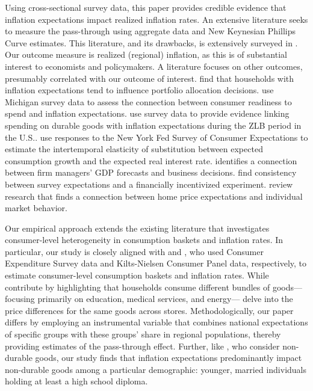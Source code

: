 \documentclass[12pt]{article}
\begin{document}
Using cross-sectional survey data, this paper provides credible evidence that inflation expectations impact realized inflation rates.  An extensive literature seeks to measure the pass-through using aggregate data and New Keynesian Phillips Curve estimates.  This literature, and its drawbacks, is extensively surveyed in \cite{Stocketal:JEL2014}.  Our outcome measure is realized (regional) inflation, as this is of substantial interest to economists and policymakers.  A literature focuses on other outcomes, presumably correlated with our outcome of interest.  \cite{Dacunto:groceryJPE} find that households with inflation expectations tend to influence portfolio allocation decisions. \cite{BachmannBergSims:AEJ2015} use Michigan survey data to assess the connection between consumer readiness to spend and inflation expectations. \cite{BurkeOzdagli:2022WP} use survey data to provide evidence linking spending on durable goods with inflation expectations during the ZLB period in the U.S.. \cite{CrumpEusepi:2021} use responses to the New York Fed Survey of Consumer Expectations to estimate the intertemporal elasticity of substitution between expected consumption growth and the expected real interest rate. \cite{TanakaBloom:JME2020} identifies a connection between firm managers' GDP forecasts and business decisions.  \cite{Armantieretal:IER2015} find consistency between survey expectations and a financially incentivized experiment. \cite{KuchlerPiazzesiStroebel:2022} review research that finds a connection between home price expectations and individual market behavior.  

Our empirical approach extends the existing literature that investigates consumer-level heterogeneity in consumption baskets and inflation rates. In particular, our study is closely aligned with \cite{HobijnLagakos:2005}  and \cite{KaplanWohl:JME2017}, who used Consumer Expenditure Survey data and Kilts-Nielsen Consumer Panel data, respectively, to estimate consumer-level consumption baskets and inflation rates. While \cite{HobijnLagakos:2005}  contribute by highlighting that households consume different bundles of goods—focusing primarily on education, medical services, and energy—\cite{KaplanWohl:JME2017} delve into the price differences for the same goods across stores. Methodologically, our paper differs by employing an instrumental variable that combines national expectations of specific groups with these groups' share in regional populations, thereby providing estimates of the pass-through effect. Further, like \cite{KaplanWohl:JME2017}, who consider non-durable goods, our study finds that inflation expectations predominantly impact non-durable goods among a particular demographic: younger, married individuals holding at least a high school diploma.
\end{document}
